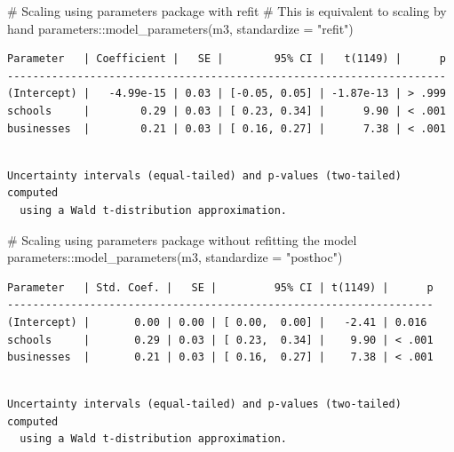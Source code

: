 \documentclass[
  letterpaper,
]{krantz}
\makeatletter
\newenvironment{Shaded}{\begin{snugshade}}{\end{snugshade}}
\newcommand{\AttributeTok}[1]{\textcolor[rgb]{0.40,0.45,0.13}{#1}}
\newcommand{\CommentTok}[1]{\textcolor[rgb]{0.37,0.37,0.37}{#1}}
\newcommand{\FunctionTok}[1]{\textcolor[rgb]{0.28,0.35,0.67}{#1}}
\newcommand{\NormalTok}[1]{\textcolor[rgb]{0.00,0.23,0.31}{#1}}
\newcommand{\SpecialCharTok}[1]{\textcolor[rgb]{0.37,0.37,0.37}{#1}}
\newcommand{\StringTok}[1]{\textcolor[rgb]{0.13,0.47,0.30}{#1}}
\newenvironment{kframe}{%
\medskip{}
\setlength{\fboxsep}{.8em}
 \def\at@end@of@kframe{}%
 \ifinner\ifhmode%
  \def\at@end@of@kframe{\end{minipage}}%
  \begin{minipage}{\columnwidth}%
 \fi\fi%
 \def\FrameCommand##1{\hskip\@totalleftmargin \hskip-\fboxsep
 \colorbox{shadecolor}{##1}\hskip-\fboxsep
     \hskip-\linewidth \hskip-\@totalleftmargin \hskip\columnwidth}%
 \MakeFramed {\advance\hsize-\width
   \@totalleftmargin\z@ \linewidth\hsize
   \@setminipage}}%
 {\par\unskip\endMakeFramed%
 \at@end@of@kframe}
\renewenvironment{Shaded}{\begin{kframe}}{\end{kframe}}
\makeatother
\begin{document}
\begin{Shaded}
\begin{Highlighting}[]
\CommentTok{\# Scaling using \textquotesingle{}parameters\textquotesingle{} package with refit}
\CommentTok{\# This is equivalent to scaling \textquotesingle{}by hand\textquotesingle{}}
\NormalTok{parameters}\SpecialCharTok{::}\FunctionTok{model\_parameters}\NormalTok{(m3, }\AttributeTok{standardize =} \StringTok{"refit"}\NormalTok{)}
\end{Highlighting}
\end{Shaded}

\begin{verbatim}
Parameter   | Coefficient |   SE |        95% CI |   t(1149) |      p
---------------------------------------------------------------------
(Intercept) |   -4.99e-15 | 0.03 | [-0.05, 0.05] | -1.87e-13 | > .999
schools     |        0.29 | 0.03 | [ 0.23, 0.34] |      9.90 | < .001
businesses  |        0.21 | 0.03 | [ 0.16, 0.27] |      7.38 | < .001
\end{verbatim}

\begin{verbatim}

Uncertainty intervals (equal-tailed) and p-values (two-tailed) computed
  using a Wald t-distribution approximation.
\end{verbatim}

\begin{Shaded}
\begin{Highlighting}[]
\CommentTok{\# Scaling using \textasciigrave{}parameters\textasciigrave{} package without refitting the model}
\NormalTok{parameters}\SpecialCharTok{::}\FunctionTok{model\_parameters}\NormalTok{(m3, }\AttributeTok{standardize =} \StringTok{"posthoc"}\NormalTok{)}
\end{Highlighting}
\end{Shaded}

\begin{verbatim}
Parameter   | Std. Coef. |   SE |         95% CI | t(1149) |      p
-------------------------------------------------------------------
(Intercept) |       0.00 | 0.00 | [ 0.00,  0.00] |   -2.41 | 0.016 
schools     |       0.29 | 0.03 | [ 0.23,  0.34] |    9.90 | < .001
businesses  |       0.21 | 0.03 | [ 0.16,  0.27] |    7.38 | < .001
\end{verbatim}

\begin{verbatim}

Uncertainty intervals (equal-tailed) and p-values (two-tailed) computed
  using a Wald t-distribution approximation.
\end{verbatim}
\end{document}
